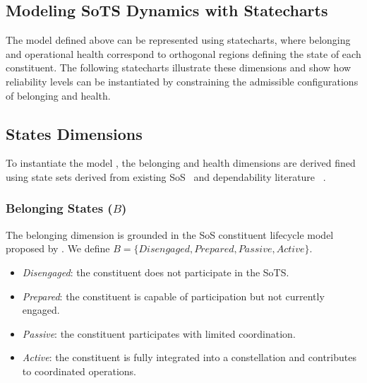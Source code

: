 \subsection{Modeling SoTS Dynamics with Statecharts}


The model defined above can be  represented using statecharts, where belonging and operational health correspond to orthogonal regions defining the state of each constituent. The following statecharts illustrate these dimensions and show how reliability levels can be instantiated by constraining the admissible configurations of belonging and health.
\fi

\subsection{States Dimensions} 
To instantiate the model , the belonging and health dimensions are derived fined using state sets derived from existing SoS~ \cite{axelsson2019refined} and dependability literature~ \cite{parhami1994multi}.

\subsubsection{Belonging States (\( B \))}
The belonging dimension is grounded in the SoS constituent lifecycle model proposed by \citet{axelsson2019refined}. We define
\( B = \{\textit{Disengaged}, \textit{Prepared}, \textit{Passive}, \textit{Active}\} \).

\begin{itemize}[noitemsep]
    \item \textit{Disengaged}: the constituent does not participate in the SoTS.
    \item \textit{Prepared}: the constituent is capable of participation but not currently engaged.
    \item \textit{Passive}: the constituent participates with limited coordination.
    \item \textit{Active}: the constituent is fully integrated into a constellation and contributes to coordinated operations.
\end{itemize}

